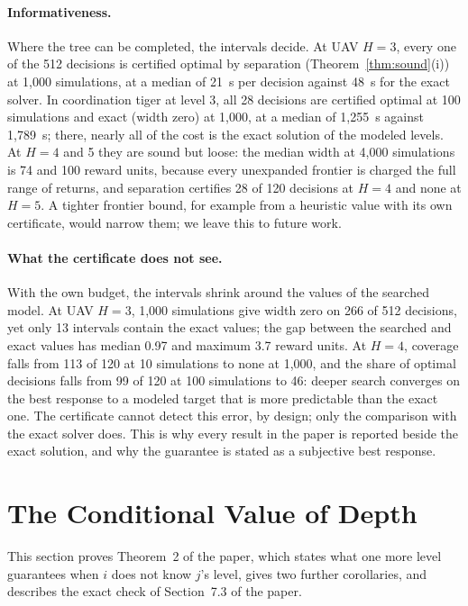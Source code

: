\documentclass{article}
\begin{document}
\paragraph{Informativeness.} Where the tree can be completed, the intervals decide. At UAV $H = 3$, every one of the 512 decisions is certified optimal by separation (Theorem~\ref{thm:sound}(i)) at 1{,}000 simulations, at a median of 21~s per decision against 48~s for the exact solver. In coordination tiger at level 3, all 28 decisions are certified optimal at 100 simulations and exact (width zero) at 1{,}000, at a median of 1{,}255~s against 1{,}789~s; there, nearly all of the cost is the exact solution of the modeled levels. At $H = 4$ and 5 they are sound but loose: the median width at 4{,}000 simulations is 74 and 100 reward units, because every unexpanded frontier is charged the full range of returns, and separation certifies 28 of 120 decisions at $H = 4$ and none at $H = 5$. A tighter frontier bound, for example from a heuristic value with its own certificate, would narrow them; we leave this to future work.

\paragraph{What the certificate does not see.} With the own budget, the intervals shrink around the values of the searched model. At UAV $H = 3$, 1{,}000 simulations give width zero on 266 of 512 decisions, yet only 13 intervals contain the exact values; the gap between the searched and exact values has median 0.97 and maximum 3.7 reward units. At $H = 4$, coverage falls from 113 of 120 at 10 simulations to none at 1{,}000, and the share of optimal decisions falls from 99 of 120 at 100 simulations to 46: deeper search converges on the best response to a modeled target that is more predictable than the exact one. The certificate cannot detect this error, by design; only the comparison with the exact solver does. This is why every result in the paper is reported beside the exact solution, and why the guarantee is stated as a subjective best response.

\section{The Conditional Value of Depth}
\label{sec:depth-theory}

This section proves Theorem~2 of the paper, which states what one more level guarantees when $i$ does not know $j$'s level, gives two further corollaries, and describes the exact check of Section~7.3 of the paper.
\end{document}
